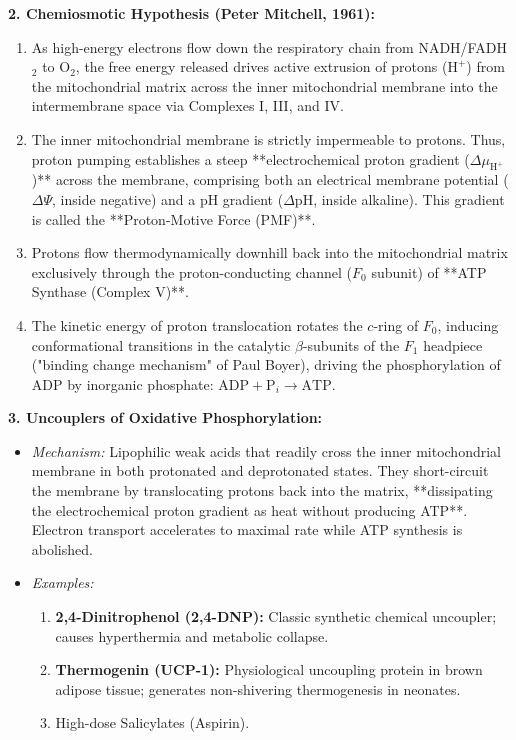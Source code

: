 \documentclass[11pt,a4paper]{article}
\begin{document}
\begin{ansbox}
\textbf{2. Chemiosmotic Hypothesis (Peter Mitchell, 1961):}
\begin{enumerate}[leftmargin=*]
    \item As high-energy electrons flow down the respiratory chain from NADH/FADH$_2$ to $\text{O}_2$, the free energy released drives active extrusion of protons ($\text{H}^+$) from the mitochondrial matrix across the inner mitochondrial membrane into the intermembrane space via Complexes I, III, and IV.
    \item The inner mitochondrial membrane is strictly impermeable to protons. Thus, proton pumping establishes a steep **electrochemical proton gradient ($\Delta \mu_{\text{H}^+}$)** across the membrane, comprising both an electrical membrane potential ($\Delta \Psi$, inside negative) and a pH gradient ($\Delta \text{pH}$, inside alkaline). This gradient is called the **Proton-Motive Force (PMF)**.
    \item Protons flow thermodynamically downhill back into the mitochondrial matrix exclusively through the proton-conducting channel ($F_0$ subunit) of **ATP Synthase (Complex V)**.
    \item The kinetic energy of proton translocation rotates the $c$-ring of $F_0$, inducing conformational transitions in the catalytic $\beta$-subunits of the $F_1$ headpiece ("binding change mechanism" of Paul Boyer), driving the phosphorylation of ADP by inorganic phosphate: $\text{ADP} + \text{P}_i \rightarrow \text{ATP}$.
\end{enumerate}

\textbf{3. Uncouplers of Oxidative Phosphorylation:}
\begin{itemize}[leftmargin=*]
    \item \textit{Mechanism:} Lipophilic weak acids that readily cross the inner mitochondrial membrane in both protonated and deprotonated states. They short-circuit the membrane by translocating protons back into the matrix, **dissipating the electrochemical proton gradient as heat without producing ATP**. Electron transport accelerates to maximal rate while ATP synthesis is abolished.
    \item \textit{Examples:}
    \begin{enumerate}
        \item \textbf{2,4-Dinitrophenol (2,4-DNP):} Classic synthetic chemical uncoupler; causes hyperthermia and metabolic collapse.
        \item \textbf{Thermogenin (UCP-1):} Physiological uncoupling protein in brown adipose tissue; generates non-shivering thermogenesis in neonates.
        \item High-dose Salicylates (Aspirin).
    \end{enumerate}
\end{itemize}
\end{ansbox}
\end{document}
